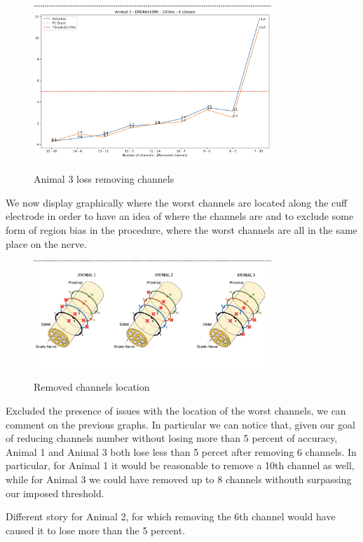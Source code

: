 \documentclass{Configuration_Files/PoliMi3i_thesis}
\begin{document}
\begin{figure}[H]
    \centering
    \includegraphics[width=0.8\textwidth]{Results Matteo/figure8}
    \label{figure8}
    \caption{Animal 3 loss removing channels}
\end{figure}

We now display graphically where the worst channels are located along the cuff electrode in order to have an idea of where the channels are and to exclude some form of region bias in the procedure, where the worst channels are all in the same place on the nerve.

\begin{figure}[H]
    \centering
    \includegraphics[width=0.8\textwidth]{Results Matteo/figure9}
    \label{figure9}
    \caption{Removed channels location}
\end{figure}

Excluded the presence of issues with the location of the worst channels, we can comment on the previous graphs.
In particular we can notice that, given our goal of reducing channels number without losing more than 5 percent of accuracy, Animal 1 and Animal 3 both lose less than 5 percet after removing 6 channels.
In particular, for Animal 1 it would be reasonable to remove a 10th channel as well, while for Animal 3 we could have removed up to 8 channels withouth surpassing our imposed threshold.

Different story for Animal 2, for which removing the 6th channel would have caused it to lose more than the 5 percent.
\end{document}
